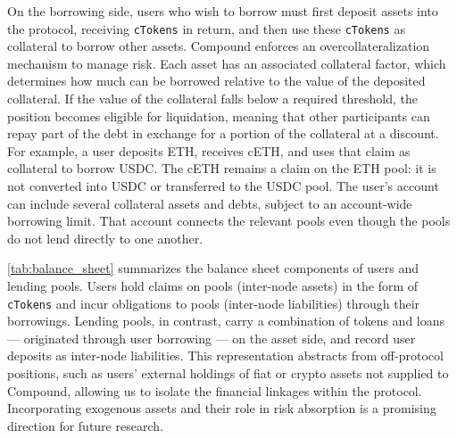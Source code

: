 \documentclass[a4paper,UKenglish,cleveref, autoref, thm-restate]{informs3}
\DeclareRobustCommand{\latestrev}[1]{{\color{red}\hypersetup{linkcolor=red,citecolor=red,urlcolor=red}#1}}
\begin{document}
On the borrowing side, users who wish to borrow must first deposit assets into the protocol, receiving \texttt{cTokens} in return, and then use these \texttt{cTokens} as collateral to borrow other assets. Compound enforces an overcollateralization mechanism to manage risk. Each asset has an associated collateral factor, which determines how much can be borrowed relative to the value of the deposited collateral. If the value of the collateral falls below a required threshold, the position becomes eligible for liquidation, meaning that other participants can repay part of the debt in exchange for a portion of the collateral at a discount. \latestrev{For example, a user deposits ETH, receives cETH, and uses that claim as collateral to borrow USDC. The cETH remains a claim on the ETH pool: it is not converted into USDC or transferred to the USDC pool. The user's account can include several collateral assets and debts, subject to an account-wide borrowing limit. That account connects the relevant pools even though the pools do not lend directly to one another.}\par

\autoref{tab:balance_sheet} summarizes the balance sheet components of users and lending pools. Users hold \latestrev{claims on pools (inter-node assets)} in the form of \texttt{cTokens} and incur \latestrev{obligations to pools (inter-node liabilities)} through their borrowings. Lending pools, in contrast, carry a combination of tokens and loans — originated through user borrowing — on the asset side, and record user deposits as inter-node liabilities. This representation abstracts from off-protocol positions, such as users' external holdings of fiat or crypto assets not supplied to Compound, allowing us to isolate the financial linkages within the protocol. Incorporating exogenous assets and their role in risk absorption is a promising direction for future research.
\end{document}
